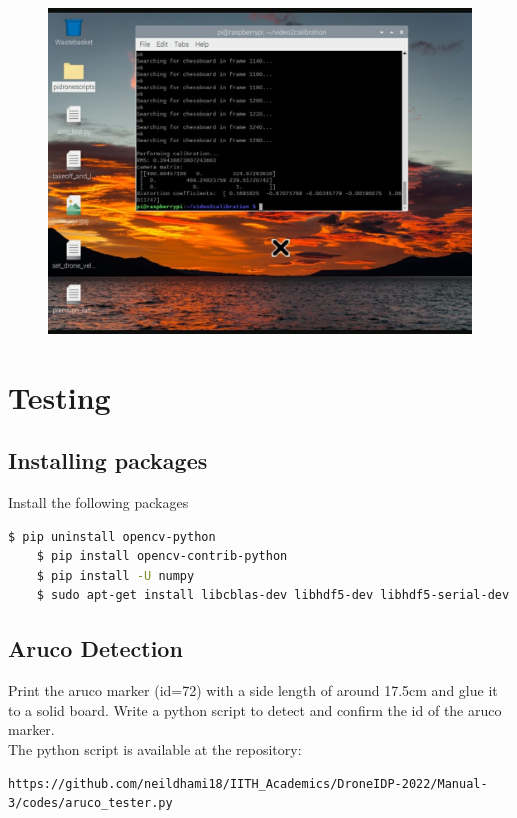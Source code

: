 \documentclass{article}
\begin{document}
\begin{figure}[!htb]
              \includegraphics[width=\linewidth]{./figs/images/img3.jpeg}
            \endminipage
\end{figure}

\section{Testing}

\subsection{Installing packages}
Install the following packages
\begin{lstlisting}[language=bash]
    $ pip uninstall opencv-python
    $ pip install opencv-contrib-python
    $ pip install -U numpy 
    $ sudo apt-get install libcblas-dev libhdf5-dev libhdf5-serial-dev libatlas-base-dev libjasper-dev libqtgui4 libqt4-test
\end{lstlisting}
 
\subsection{Aruco Detection}
Print the aruco marker (id=72) with a side length of around 17.5cm and glue it to a solid board. Write a python script to detect and confirm the id of the aruco marker. 
\\
The python script is available at the repository:
\begin{lstlisting}
https://github.com/neildhami18/IITH_Academics/DroneIDP-2022/Manual-3/codes/aruco_tester.py
\end{lstlisting}
\end{document}
